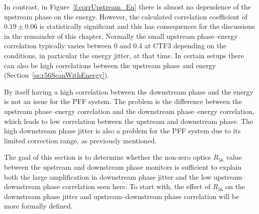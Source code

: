 In contrast, in Figure~\ref{f:corrUpstream_En} there is almost no dependence of the upstream phase on the energy. However, the calculated correlation coefficient of \(0.19\pm0.06\) is statistically significant and this has consequences for the discussions in the remainder of this chapter. Normally the small upstream phase--energy correlation typically varies between 0 and 0.4 at CTF3 depending on the conditions, in particular the energy jitter, at that time. In certain setups there can also be high correlations between the upstream phase and energy (Section~\ref{ss:r56ScanWithEnergy}).

By itself having a high correlation between the downstream phase and the energy is not an issue for the PFF system. The problem is the difference between the upstream phase--energy correlation and the downstream phase--energy correlation, which leads to low correlation between the upstream and downstream phase. The high downstream phase jitter is also a problem for the PFF system due to its limited correction range, as previously mentioned.

The goal of this section is to determine whether the non-zero optics \(R_{56}\) value between the upstream and downstream phase monitors is sufficient to explain both the large amplification in downstream phase jitter and the low upstream--downstream phase correlation seen here. To start with, the effect of \(R_{56}\) on the downstream phase jitter and upstream--downstream phase correlation will be more formally defined.

